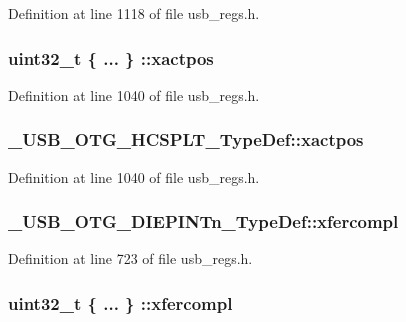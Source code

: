 Definition at line 1118 of file usb\-\_\-regs.\-h.

\hypertarget{group___u_s_b___o_t_g___d_r_i_v_e_r_ga9d6fed4e8d4f17a73fc0e9a4f4d8b598}{
\subsubsection[{xactpos}]{\setlength{\rightskip}{0pt plus 5cm}uint32\-\_\-t \{ ... \} \-::xactpos}}\label{group___u_s_b___o_t_g___d_r_i_v_e_r_ga9d6fed4e8d4f17a73fc0e9a4f4d8b598}


Definition at line 1040 of file usb\-\_\-regs.\-h.

\hypertarget{group___u_s_b___o_t_g___d_r_i_v_e_r_ga37c594251d0de7c398bcecae8f4a6780}{
\subsubsection[{xactpos}]{ \-\_\-\-U\-S\-B\-\_\-\-O\-T\-G\-\_\-\-H\-C\-S\-P\-L\-T\-\_\-\-Type\-Def\-::xactpos}}\label{group___u_s_b___o_t_g___d_r_i_v_e_r_ga37c594251d0de7c398bcecae8f4a6780}


Definition at line 1040 of file usb\-\_\-regs.\-h.

\hypertarget{group___u_s_b___o_t_g___d_r_i_v_e_r_ga03b1ad5ac06af458fc8d10eee710ceb5}{
\subsubsection[{xfercompl}]{ \-\_\-\-U\-S\-B\-\_\-\-O\-T\-G\-\_\-\-D\-I\-E\-P\-I\-N\-Tn\-\_\-\-Type\-Def\-::xfercompl}}\label{group___u_s_b___o_t_g___d_r_i_v_e_r_ga03b1ad5ac06af458fc8d10eee710ceb5}


Definition at line 723 of file usb\-\_\-regs.\-h.

\hypertarget{group___u_s_b___o_t_g___d_r_i_v_e_r_gafb232db4ead470e9229606657030d926}{
\subsubsection[{xfercompl}]{\setlength{\rightskip}{0pt plus 5cm}uint32\-\_\-t \{ ... \} \-::xfercompl}}\label{group___u_s_b___o_t_g___d_r_i_v_e_r_gafb232db4ead470e9229606657030d926}


